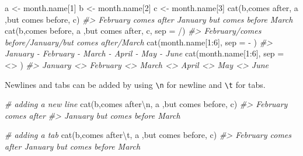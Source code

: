 \documentclass[
]{book}
\newenvironment{Shaded}{\begin{snugshade}}{\end{snugshade}}
\newcommand{\AttributeTok}[1]{\textcolor[rgb]{0.77,0.63,0.00}{#1}}
\newcommand{\CommentTok}[1]{\textcolor[rgb]{0.56,0.35,0.01}{\textit{#1}}}
\newcommand{\DecValTok}[1]{\textcolor[rgb]{0.00,0.00,0.81}{#1}}
\newcommand{\FunctionTok}[1]{\textcolor[rgb]{0.00,0.00,0.00}{#1}}
\newcommand{\NormalTok}[1]{#1}
\newcommand{\OtherTok}[1]{\textcolor[rgb]{0.56,0.35,0.01}{#1}}
\newcommand{\SpecialCharTok}[1]{\textcolor[rgb]{0.00,0.00,0.00}{#1}}
\newcommand{\StringTok}[1]{\textcolor[rgb]{0.31,0.60,0.02}{#1}}
\begin{document}
\begin{Shaded}
\begin{Highlighting}[]
\NormalTok{a }\OtherTok{\textless{}{-}}\NormalTok{ month.name[}\DecValTok{1}\NormalTok{]}
\NormalTok{b }\OtherTok{\textless{}{-}}\NormalTok{ month.name[}\DecValTok{2}\NormalTok{]}
\NormalTok{c }\OtherTok{\textless{}{-}}\NormalTok{ month.name[}\DecValTok{3}\NormalTok{]}
\FunctionTok{cat}\NormalTok{(b,}\StringTok{\textquotesingle{}comes after\textquotesingle{}}\NormalTok{, a ,}\StringTok{\textquotesingle{}but comes before\textquotesingle{}}\NormalTok{, c)}
\CommentTok{\#\textgreater{} February comes after January but comes before March}
\FunctionTok{cat}\NormalTok{(b,}\StringTok{\textquotesingle{}comes before\textquotesingle{}}\NormalTok{, a ,}\StringTok{\textquotesingle{}but comes after\textquotesingle{}}\NormalTok{, c, }\AttributeTok{sep =} \StringTok{\textquotesingle{}/\textquotesingle{}}\NormalTok{)}
\CommentTok{\#\textgreater{} February/comes before/January/but comes after/March}
\FunctionTok{cat}\NormalTok{(month.name[}\DecValTok{1}\SpecialCharTok{:}\DecValTok{6}\NormalTok{], }\AttributeTok{sep =} \StringTok{\textquotesingle{} {-} \textquotesingle{}}\NormalTok{)}
\CommentTok{\#\textgreater{} January {-} February {-} March {-} April {-} May {-} June}
\FunctionTok{cat}\NormalTok{(month.name[}\DecValTok{1}\SpecialCharTok{:}\DecValTok{6}\NormalTok{], }\AttributeTok{sep =} \StringTok{\textquotesingle{} \textless{}\textgreater{} \textquotesingle{}}\NormalTok{)}
\CommentTok{\#\textgreater{} January \textless{}\textgreater{} February \textless{}\textgreater{} March \textless{}\textgreater{} April \textless{}\textgreater{} May \textless{}\textgreater{} June}
\end{Highlighting}
\end{Shaded}

Newlines and tabs can be added by using \texttt{\textbackslash{}n} for newline and \texttt{\textbackslash{}t} for tabs.

\begin{Shaded}
\begin{Highlighting}[]
\CommentTok{\# adding a new line}
\FunctionTok{cat}\NormalTok{(b,}\StringTok{\textquotesingle{}comes after}\SpecialCharTok{\textbackslash{}n}\StringTok{\textquotesingle{}}\NormalTok{, a ,}\StringTok{\textquotesingle{}but comes before\textquotesingle{}}\NormalTok{, c)}
\CommentTok{\#\textgreater{} February comes after}
\CommentTok{\#\textgreater{}  January but comes before March}

\CommentTok{\# adding a tab}
\FunctionTok{cat}\NormalTok{(b,}\StringTok{\textquotesingle{}comes after}\SpecialCharTok{\textbackslash{}t}\StringTok{\textquotesingle{}}\NormalTok{, a ,}\StringTok{\textquotesingle{}but comes before\textquotesingle{}}\NormalTok{, c)}
\CommentTok{\#\textgreater{} February comes after  January but comes before March}
\end{Highlighting}
\end{Shaded}
\end{document}
